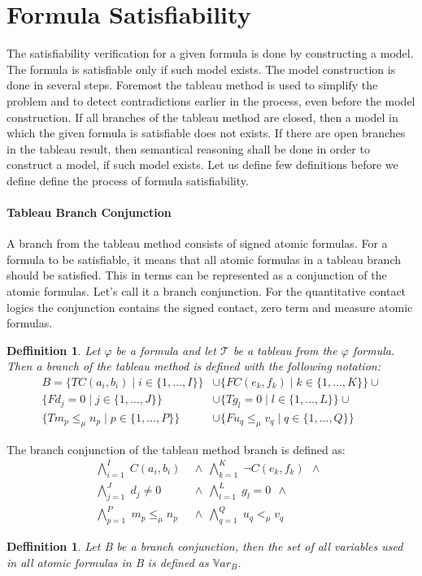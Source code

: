 \documentclass{article}
\newtheorem{defn}[theorem]{Deffinition}
\newcommand{\Var}{\mathbb{V}ar}
\newcommand{\BranchConjunction}{%
\begin{align*}
			\bigwedge_{i=1}^{I} \; C(a_i, b_i) \:\: & \wedge \:\: 
			\bigwedge_{k=1}^{K} \; \neg C(e_k, f_k) \:\: \wedge \:\: \\
			\bigwedge_{j=1}^{J} \; d_j \neq 0 \:\: & \wedge \:\:
			\bigwedge_{l=1}^{L} \; g_l = 0 \:\: \wedge \:\:\\
			\bigwedge_{p=1}^{P} \; m_p \le_\mu n_p \:\: &\wedge \:\:
			\bigwedge_{q=1}^{Q} \; u_q <_\mu v_q \:\:
\end{align*}%
}
\begin{document}
	\section{Formula Satisfiability} 
The satisfiability verification for a given formula is done by constructing a model. The formula is satisfiable only if such model exists. The model construction is done in several steps. Foremost the tableau method is used to simplify the problem and to detect contradictions earlier in the process, even before the model construction. If all branches of the tableau method are closed, then a model in which the given formula is satisfiable does not exists. If there are open branches in the tableau result, then semantical reasoning shall be done in order to construct a model, if such model exists. Let us define few definitions before we define define the process of formula satisfiability. 

	\paragraph{Tableau Branch Conjunction}
		A branch from the tableau method consists of signed atomic formulas. For a formula to be satisfiable, it means that all atomic formulas in a tableau branch should be satisfied. This in terms can be represented as a conjunction of the atomic formulas. Let's call it a branch conjunction. For the quantitative contact logics the conjunction contains the signed contact, zero term and measure atomic formulas.
	\begin{defn}
		Let $\varphi$ be a formula and let $\mathcal{T}$ be a tableau from the $\varphi$ formula. Then a branch of the tableau method is defined with the following notation:
		\begin{align*}
				B = \{T C(a_i, b_i) \mid i \in \{1, \ldots, I\} \} &\cup 
					\{F C(e_k, f_k) \mid k \in \{1, \ldots, K\} \} \cup \\
					\{F d_j = 0 \mid j \in \{1, \ldots, J\} \} &\cup 
					\{T g_l = 0 \mid l \in \{1, \ldots, L\} \} \cup \\
					\{T m_p \le_\mu n_p \mid p \in \{1, \ldots, P\} \} &\cup 
					\{F u_q \le_\mu v_q \mid q \in \{1, \ldots, Q\} \}
		\end{align*}
	\end{defn}
	The branch conjunction of the tableau method branch is defined as:
	\BranchConjunction

	\begin{defn}
		Let B be a branch conjunction, then the set of all variables used in all atomic formulas in B is defined as $\Var_B$.
	\end{defn}
\end{document}

